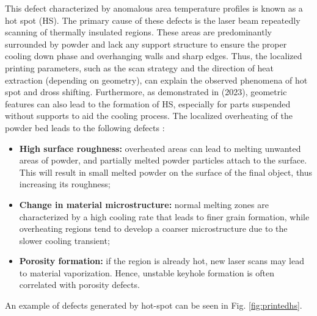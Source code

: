 This defect characterized by anomalous area temperature profiles is known as a hot spot (HS). The primary cause of these defects is the laser beam repeatedly scanning of thermally insulated regions. These areas are predominantly surrounded by powder and lack any support structure to ensure the proper cooling down phase and overhanging walls and sharp edges. Thus, the localized printing parameters, such as the scan strategy and the direction of heat extraction (depending on geometry), can explain the observed phenomena of hot spot and dross shifting. Furthermore, as demonstrated in \citeauthor{moshiri_performance_2023} (2023), geometric features can also lead to the formation of HS, especially for parts suspended without supports to aid the cooling process. The localized overheating of the powder bed leads to the following defects \cite{bugatti_towards_2022}:
\begin{itemize}
    \item \textbf{High surface roughness:} overheated areas can lead to melting unwanted areas of powder, and partially melted powder particles attach to the surface. This will result in small melted powder on the surface of the final object, thus increasing its roughness;
    \item \textbf{Change in material microstructure:} normal melting zones are characterized by a high cooling rate that leads to finer grain formation, while overheating regions tend to develop a coarser microstructure due to the slower cooling transient;
    \item \textbf{Porosity formation:} if the region is already hot, new laser scans may lead to material vaporization. Hence, unstable keyhole formation is often correlated with porosity defects.
\end{itemize} An example of defects generated by hot-spot can be seen in Fig. \ref{fig:printedhs}.
